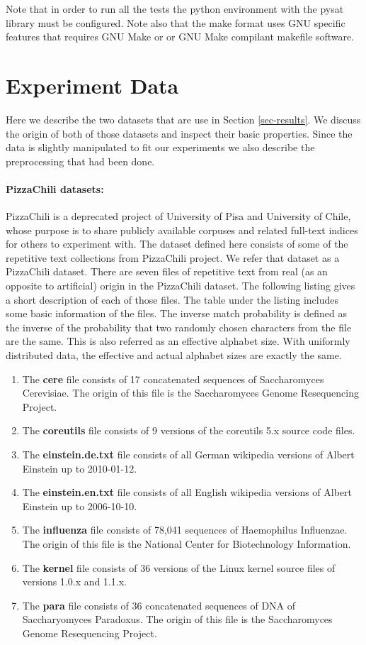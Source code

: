 \documentclass[english,twoside,censored,csm,algorithms-track-2020]{HYthesisML}
\theoremstyle{plain}
\theoremstyle{definition}
\begin{document}
Note that in order to run all the tests the python environment with the pysat library must be configured.
Note also that the make format uses GNU specific features that requires GNU Make or or GNU Make compilant
makefile software. 



\section{Experiment Data}
Here we describe the two datasets that are use in Section \ref{sec-results}. We discuss the origin
of both of those datasets and inspect their basic properties. Since the data is slightly manipulated
to fit our experiments we also describe the preprocessing that had been done.

\paragraph{PizzaChili datasets:}
PizzaChili is a deprecated project of University of Pisa and University of Chile, whose purpose is to
share publicly available corpuses and related full-text indices for others to experiment with.
The dataset defined here consists of some of the repetitive text collections from PizzaChili project.
We refer that dataset as a PizzaChili dataset.
There are seven files of repetitive text from real (as an opposite to artificial) origin in the
PizzaChili dataset. The following listing gives a short description of each of those files. The table
under the listing includes some basic information of the files. The inverse match probability is defined
as the inverse of the probability that two randomly chosen characters from the file are the same. This
is also referred as an effective alphabet size. With uniformly distributed data, the effective and
actual alphabet sizes are exactly the same.

\begin{enumerate}
\item The \textbf{cere} file consists of 17 concatenated sequences of Saccharomyces Cerevisiae. The origin of this file is the Saccharomyces Genome Resequencing Project.
\item The \textbf{coreutils} file consists of 9 versions of the coreutils 5.x source code files.
\item The \textbf{einstein.de.txt} file consists of all German wikipedia versions of Albert Einstein up to 2010-01-12.
\item  The \textbf{einstein.en.txt} file consists of all English wikipedia versions of Albert Einstein up to 2006-10-10.
\item The \textbf{influenza} file consists of 78,041 sequences of Haemophilus Influenzae. The origin of this file is the National Center for Biotechnology Information.
\item The \textbf{kernel} file consists of 36 versions of the Linux kernel source files of versions 1.0.x and 1.1.x.
\item The \textbf{para} file consists of 36 concatenated sequences of DNA of Saccharyomyces Paradoxus. The origin of this file is the Saccharomyces Genome Resequencing Project.
\end{enumerate}
\end{document}
